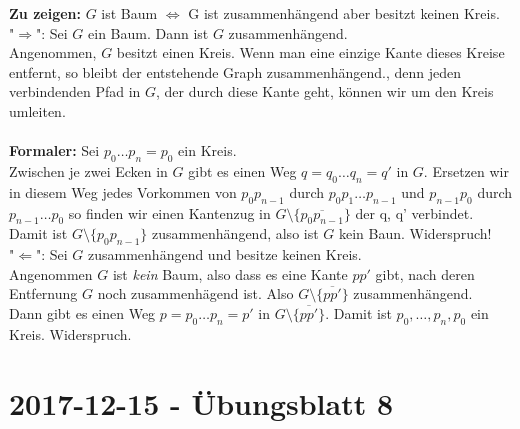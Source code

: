 \begin{problem*}[4]
\textbf{Zu zeigen:} $ G $ ist Baum $ \Longleftrightarrow $ G ist zusammenhängend aber besitzt keinen Kreis.\\
"$\Rightarrow$": Sei $ G $ ein Baum. Dann ist $ G $ zusammenhängend.\\
Angenommen, $ G $ besitzt einen Kreis. Wenn man eine einzige Kante dieses Kreise entfernt, so bleibt der entstehende Graph zusammenhängend., denn jeden verbindenden Pfad in $ G $, der durch diese Kante geht, können wir um den Kreis umleiten.\\ 
\\
\textbf{Formaler:} Sei $p_0 \dots p_n = p_0$ ein Kreis.\\
Zwischen je zwei Ecken in $ G $ gibt es einen Weg $q = q_0 \dots q_n = q' $ in $ G $. Ersetzen wir in diesem Weg jedes Vorkommen von $ p_0p_{ n-1 } $ durch $p_0p_1 \dots p_{ n-1 }$ und $p_{ n-1 }p_0$ durch $p_{ n-1 } \dots p_0$ so finden wir einen Kantenzug in $ G \setminus \{ \overline{ p_0p_{ n-1 } } \}$ der q, q' verbindet.\\
Damit ist $ G \setminus \{ p_0p_{ n-1 } \}$ zusammenhängend, also ist $ G $ kein Baun. Widerspruch!\\
"$\Leftarrow$": Sei $ G $ zusammenhängend und besitze keinen Kreis. \\
Angenommen $ G $ ist \emph{kein} Baum, also dass es eine Kante $ pp' $ gibt, nach deren Entfernung $ G $ noch zusammenhägend ist. Also $ G \setminus \{ \overline{pp'} \}$ zusammenhängend. \\
Dann gibt es einen Weg $p = p_0 \dots p_n = p'$ in $ G \setminus \{ \overline{pp'} \}$. Damit ist $p_0, \dots, p_n, p_0$ ein Kreis. Widerspruch.

\end{problem*}



\section{2017-12-15 - Übungsblatt 8} %
\label{sec:2017_12_15_übungsblatt_8}

